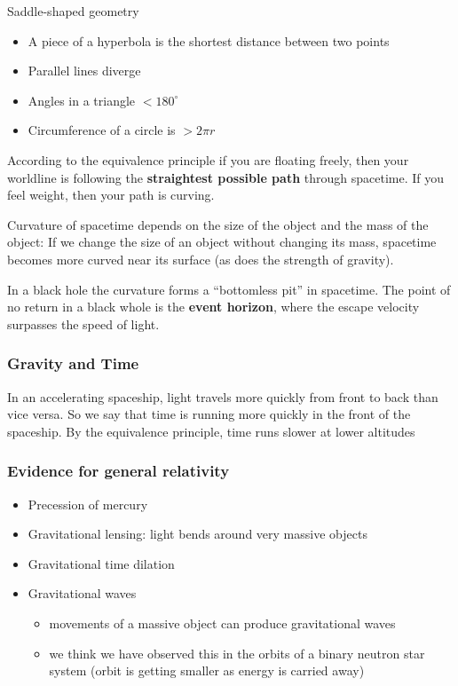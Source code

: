 Saddle-shaped geometry
\begin{itemize}
    \item A piece of a hyperbola is the shortest distance between two points
    \item Parallel lines diverge
    \item Angles in a triangle $< 180^\circ$
    \item Circumference of a circle is $> 2\pi r$
\end{itemize}

According to the equivalence principle if you are floating freely, then your worldline is following the \textbf{straightest possible path} through spacetime.  If you feel weight, then your path is curving.


Curvature of spacetime depends on the size of the object and the mass of the object:  If we change the size of an object without changing its mass, spacetime becomes more curved near its surface (as does the strength of gravity).

In a black hole the curvature forms a ``bottomless pit'' in spacetime.  The point of no return in a black whole is the \textbf{event horizon}, where the escape velocity surpasses the speed of light.

\subsubsection{Gravity and Time}

In an accelerating spaceship, light travels more quickly from front to back than vice versa.  So we say that time is running more quickly in the front of the spaceship.  By the equivalence principle, time runs slower at lower altitudes

\subsubsection{Evidence for general relativity}

\begin{itemize}
    \item Precession of mercury
    \item Gravitational lensing: light bends around very massive objects
    \item Gravitational time dilation
    \item Gravitational waves
    \begin{itemize}
        \item movements of a massive object can produce gravitational waves
        \item we think we have observed this in the orbits of a binary neutron star system (orbit is getting smaller as energy is carried away)
    \end{itemize}
\end{itemize}
